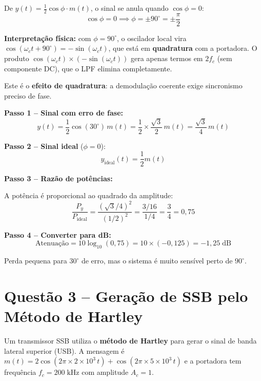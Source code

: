 \documentclass[11pt,a4paper]{article}
\begin{document}
\begin{resolucao}

De $y(t) = \frac{1}{2}\cos\phi \cdot m(t)$, o sinal se anula quando $\cos\phi = 0$:
\[
  \cos\phi = 0 \implies \boxed{\phi = \pm 90^\circ = \pm\frac{\pi}{2}}
\]

\textbf{Interpretação física:} com $\phi = 90^\circ$, o oscilador local vira $\cos(\omega_c t + 90^\circ) = -\sin(\omega_c t)$, que está em \textbf{quadratura} com a portadora. O produto $\cos(\omega_c t) \times (-\sin(\omega_c t))$ gera apenas termos em $2f_c$ (sem componente DC), que o LPF elimina completamente.

Este é o \textbf{efeito de quadratura}: a demodulação coerente exige sincronismo preciso de fase.
\end{resolucao}

\begin{resolucao}[Item d -- Atenuação para phi = 30 graus]

\textbf{Passo 1 -- Sinal com erro de fase:}
\[
  y(t) = \frac{1}{2}\cos(30^\circ)\,m(t) = \frac{1}{2} \times \frac{\sqrt{3}}{2}\,m(t) = \frac{\sqrt{3}}{4}\,m(t)
\]

\textbf{Passo 2 -- Sinal ideal} ($\phi = 0$):
\[
  y_{\text{ideal}}(t) = \frac{1}{2}m(t)
\]

\textbf{Passo 3 -- Razão de potências:}

A potência é proporcional ao quadrado da amplitude:
\[
  \frac{P_y}{P_{\text{ideal}}} = \frac{(\sqrt{3}/4)^2}{(1/2)^2} = \frac{3/16}{1/4} = \frac{3}{4} = 0{,}75
\]

\textbf{Passo 4 -- Converter para dB:}
\[
  \text{Atenuação} = 10\log_{10}(0{,}75) = 10 \times (-0{,}125) = \boxed{-1{,}25\;\text{dB}}
\]

Perda pequena para $30^\circ$ de erro, mas o sistema é muito sensível perto de $90^\circ$.
\end{resolucao}


\section*{Questão 3 -- Geração de SSB pelo Método de Hartley}

Um transmissor SSB utiliza o \textbf{método de Hartley} para gerar o sinal de banda lateral superior (USB). A mensagem é $m(t) = 2\cos(2\pi \times 2 \times 10^3\,t) + \cos(2\pi \times 5 \times 10^3\,t)$ e a portadora tem frequência $f_c = 200\;\text{kHz}$ com amplitude $A_c = 1$.
\end{document}
